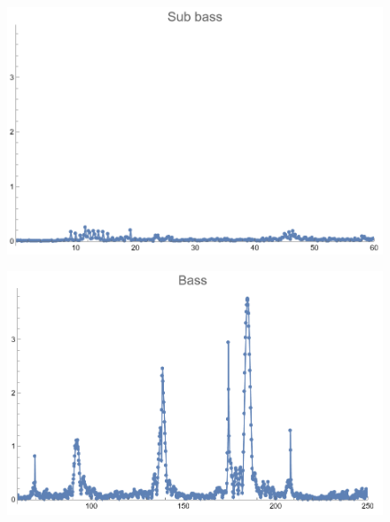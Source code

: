 \documentclass[12pt, letterpaper]{article}
\begin{document}
\begin{figure}[H]
  \centering
  \begin{minipage}{.5\textwidth}
    \centering
    \includegraphics[width=.9\linewidth]{imgs/Cancion4/subbass.png}
    \label{fig:04b}
  \end{minipage}%
  \begin{minipage}{.5\textwidth}
    \centering
    \includegraphics[width=.9\linewidth]{imgs/Cancion4/bass.png}
    \label{fig:04c}
  \end{minipage}
\end{figure}
\end{document}
